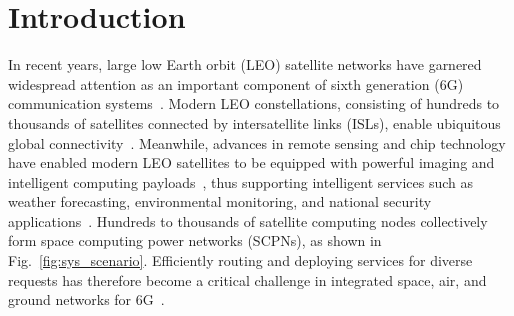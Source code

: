 \documentclass[10pt, conference, letterpaper]{IEEEtran}
\begin{document}
\begin{abstract}
Extensive simulations demonstrate the superior performance of ELARA, achieving approximately 43\% savings in energy consumption and a 21\% reduction in latency compared to leading methods like SECO, service pressure-based routing, and heuristic-based algorithms. These results highlight ELARA's capability to optimize microservice orchestration in time-varying and heterogeneous SCPN environments.
\end{abstract}

\section{Introduction}
\label{sec:intro}

In recent years, large low Earth orbit (LEO) satellite networks have garnered widespread attention as an important component of sixth generation (6G) communication systems~\cite{shi2025satellite}.
Modern LEO constellations, consisting of hundreds to thousands of satellites connected by intersatellite links (ISLs), enable ubiquitous global connectivity~\cite{net_char_StarLink_LEO}.
Meanwhile, advances in remote sensing and chip technology have enabled modern LEO satellites to be equipped with powerful imaging and intelligent computing payloads~\cite{mi2019intelligent, shen2023survey}, thus supporting intelligent services such as weather forecasting, environmental monitoring, and national security applications~\cite{satellite_sys_survey, progress_challenge_RS_satellite}.
Hundreds to thousands of satellite computing nodes collectively form space computing power networks (SCPNs), as shown in Fig.~\ref{fig:sys_scenario}. Efficiently routing and deploying services for diverse requests has therefore become a critical challenge in integrated space, air, and ground networks for 6G~\cite{SAG_survey_6g}.
\end{document}
